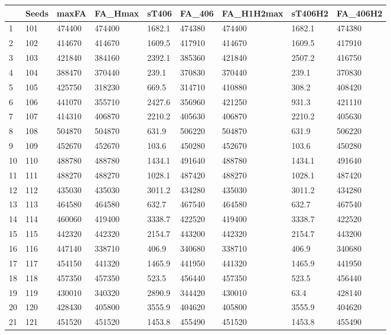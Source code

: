 \begin{tabular}{lllllllll}
& Seeds & maxFA & FA_Hmax & sT406 & FA_406 & FA_H1H2max & sT406H2 & FA_406H2 \\ 
\hline 
1 & 101 & 474400 & 474400 & 1682.1 & 474380 & 474400 & 1682.1 & 474380 \\ 
2 & 102 & 414670 & 414670 & 1609.5 & 417910 & 414670 & 1609.5 & 417910 \\ 
3 & 103 & 421840 & 384160 & 2392.1 & 385360 & 421840 & 2507.2 & 416750 \\ 
4 & 104 & 388470 & 370440 & 239.1 & 370830 & 370440 & 239.1 & 370830 \\ 
5 & 105 & 425750 & 318230 & 669.5 & 314710 & 410880 & 308.2 & 408420 \\ 
6 & 106 & 441070 & 355710 & 2427.6 & 356960 & 421250 & 931.3 & 421110 \\ 
7 & 107 & 414310 & 406870 & 2210.2 & 405630 & 406870 & 2210.2 & 405630 \\ 
8 & 108 & 504870 & 504870 & 631.9 & 506220 & 504870 & 631.9 & 506220 \\ 
9 & 109 & 452670 & 452670 & 103.6 & 450280 & 452670 & 103.6 & 450280 \\ 
10 & 110 & 488780 & 488780 & 1434.1 & 491640 & 488780 & 1434.1 & 491640 \\ 
11 & 111 & 488270 & 488270 & 1028.1 & 487420 & 488270 & 1028.1 & 487420 \\ 
12 & 112 & 435030 & 435030 & 3011.2 & 434280 & 435030 & 3011.2 & 434280 \\ 
13 & 113 & 464580 & 464580 & 632.7 & 467540 & 464580 & 632.7 & 467540 \\ 
14 & 114 & 460060 & 419400 & 3338.7 & 422520 & 419400 & 3338.7 & 422520 \\ 
15 & 115 & 442320 & 442320 & 2154.7 & 443200 & 442320 & 2154.7 & 443200 \\ 
16 & 116 & 447140 & 338710 & 406.9 & 340680 & 338710 & 406.9 & 340680 \\ 
17 & 117 & 454150 & 441320 & 1465.9 & 441950 & 441320 & 1465.9 & 441950 \\ 
18 & 118 & 457350 & 457350 & 523.5 & 456440 & 457350 & 523.5 & 456440 \\ 
19 & 119 & 430010 & 340320 & 2890.9 & 344420 & 430010 & 63.4 & 428140 \\ 
20 & 120 & 428430 & 405800 & 3555.9 & 404620 & 405800 & 3555.9 & 404620 \\ 
21 & 121 & 451520 & 451520 & 1453.8 & 455490 & 451520 & 1453.8 & 455490 \\ 

\end{tabular}
